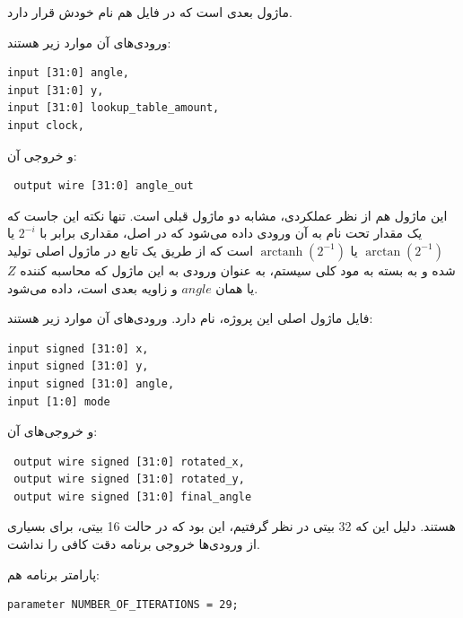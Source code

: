 \documentclass[12pt,titlepage,a4page , tikz , multi,table , svgnames,xcdraw]{article}
\DeclareMathOperator\arctanh{arctanh}
\begin{document}
\hrulefill


ماژول بعدی  است که در فایل هم نام خودش قرار دارد.

 
 ورودی‌های آن موارد زیر هستند:

\begin{latin}
\begin{verbatim}
input [31:0] angle,
input [31:0] y,
input [31:0] lookup_table_amount,
input clock,
\end{verbatim}
\end{latin}

و خروجی آن:

\begin{latin}
\begin{verbatim}
 output wire [31:0] angle_out
\end{verbatim}
\end{latin}

این ماژول هم از نظر عملکردی، مشابه دو ماژول قبلی است. تنها نکته این جاست که یک مقدار تحت نام  به آن ورودی داده می‌شود که در اصل، مقداری برابر با $2^{-i}$ یا $\arctan (2^{-1})$ یا
$\arctanh (2^{-1})$
است که از طریق یک تابع در ماژول اصلی تولید شده و به بسته به مود کلی سیستم، به عنوان ورودی به این ماژول که محاسبه کننده $Z$ یا همان $angle$ و زاویه بعدی است، داده می‌شود.

\hrulefill

فایل ماژول اصلی این پروژه،  نام دارد. ورودی‌های آن موارد زیر هستند:

\begin{latin}
\begin{verbatim}
input signed [31:0] x,
input signed [31:0] y,
input signed [31:0] angle,
input [1:0] mode
\end{verbatim}
\end{latin}

و خروجی‌های آن:

\begin{latin}
\begin{verbatim}
 output wire signed [31:0] rotated_x,
 output wire signed [31:0] rotated_y,
 output wire signed [31:0] final_angle
\end{verbatim}
\end{latin}

هستند. دلیل این که 32 بیتی در نظر گرفتیم، این بود که در حالت 16 بیتی، برای بسیاری از ورودی‌ها خروجی برنامه دقت کافی را نداشت.

پارامتر برنامه هم:

\begin{latin}
\begin{verbatim}
parameter NUMBER_OF_ITERATIONS = 29;
\end{verbatim}
\end{latin}
\end{document}
